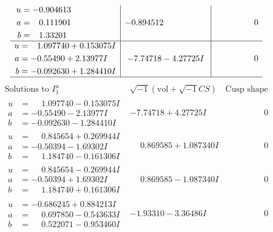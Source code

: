\documentclass[1p]{elsarticle_modified}
\theoremstyle{definition}
\newcommand{\I}{\sqrt{-1}}
\begin{document}
$$\begin{array}{c|c|c}
\begin{aligned}
u &= -0.904613\phantom{ +0.000000I} \\
a &= \phantom{-}0.111901\phantom{ +0.000000I} \\
b &= \phantom{-}1.33201\phantom{ +0.000000I}\end{aligned}
 & -0.894512\phantom{ +0.000000I} & \phantom{-0.000000 } 0 \\ \hline\begin{aligned}
u &= \phantom{-}1.097740 + 0.153075 I \\
a &= -0.55490 + 2.13977 I \\
b &= -0.092630 + 1.284410 I\end{aligned}
 & -7.74718 - 4.27725 I & \phantom{-0.000000 } 0\\
 \hline 
 \end{array}$$\newpage$$\begin{array}{c|c|c}  
\text{Solutions to }I^u_{1}& \I (\text{vol} + \sqrt{-1}CS) & \text{Cusp shape}\\
 \hline 
\begin{aligned}
u &= \phantom{-}1.097740 - 0.153075 I \\
a &= -0.55490 - 2.13977 I \\
b &= -0.092630 - 1.284410 I\end{aligned}
 & -7.74718 + 4.27725 I & \phantom{-0.000000 } 0 \\ \hline\begin{aligned}
u &= \phantom{-}0.845654 + 0.269944 I \\
a &= -0.50394 - 1.69302 I \\
b &= \phantom{-}1.184740 - 0.161306 I\end{aligned}
 & \phantom{-}0.869585 + 1.087340 I & \phantom{-0.000000 } 0 \\ \hline\begin{aligned}
u &= \phantom{-}0.845654 - 0.269944 I \\
a &= -0.50394 + 1.69302 I \\
b &= \phantom{-}1.184740 + 0.161306 I\end{aligned}
 & \phantom{-}0.869585 - 1.087340 I & \phantom{-0.000000 } 0 \\ \hline\begin{aligned}
u &= -0.686245 + 0.884213 I \\
a &= \phantom{-}0.697850 - 0.543633 I \\
b &= \phantom{-}0.522071 - 0.953460 I\end{aligned}
 & -1.93310 - 3.36486 I & \phantom{-0.000000 } 0 \\ \hline\begin{aligned}

\end{aligned}
\end{array}$$
\end{document}
